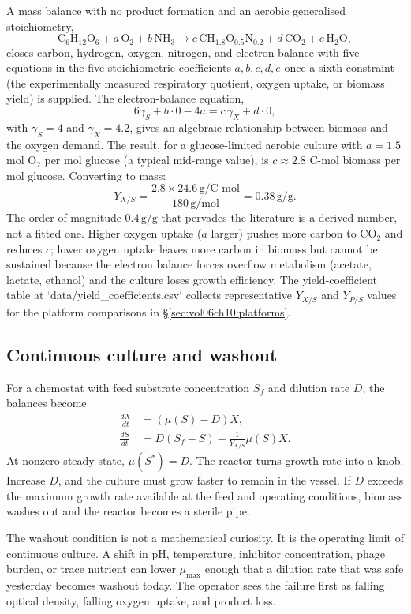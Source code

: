 A mass balance with no product formation and an aerobic generalised
stoichiometry,
\[
\text{C}_6\text{H}_{12}\text{O}_6 + a\,\text{O}_2 + b\,\text{NH}_3
\longrightarrow c\,\text{CH}_{1.8}\text{O}_{0.5}\text{N}_{0.2}
+ d\,\text{CO}_2 + e\,\text{H}_2\text{O},
\]
closes carbon, hydrogen, oxygen, nitrogen, and electron balance with
five equations in the five stoichiometric coefficients $a, b, c, d, e$
once a sixth constraint (the experimentally measured respiratory
quotient, oxygen uptake, or biomass yield) is supplied. The
electron-balance equation,
\[
6\gamma_S + b \cdot 0 - 4a = c\,\gamma_X + d \cdot 0,
\]
with $\gamma_S = 4$ and $\gamma_X = 4.2$, gives an algebraic
relationship between biomass and the oxygen demand. The result, for a
glucose-limited aerobic culture with $a = 1.5$ mol $\text{O}_2$ per mol
glucose (a typical mid-range value), is $c \approx 2.8$ C-mol biomass
per mol glucose. Converting to mass:
\[
Y_{X/S}
= \frac{2.8 \times 24.6\,\text{g/C-mol}}{180\,\text{g/mol}}
= 0.38\,\text{g/g}.
\]
The order-of-magnitude $0.4\,\text{g/g}$ that pervades the literature
is a derived number, not a fitted one. Higher oxygen uptake ($a$ larger)
pushes more carbon to CO$_2$ and reduces $c$; lower oxygen uptake leaves
more carbon in biomass but cannot be sustained because the electron
balance forces overflow metabolism (acetate, lactate, ethanol) and the
culture loses growth efficiency. The yield-coefficient table at
`data/yield_coefficients.csv` collects representative $Y_{X/S}$ and
$Y_{P/S}$ values for the platform comparisons in \S\ref{sec:vol06ch10:platforms}.

\subsection{Continuous culture and washout}

For a chemostat with feed substrate concentration $S_f$ and dilution
rate $D$, the balances become
\begin{align*}
\frac{dX}{dt} &= \left(\mu(S) - D\right)X, \\
\frac{dS}{dt} &= D(S_f - S) - \frac{1}{Y_{X/S}}\mu(S)X.
\end{align*}
At nonzero steady state, $\mu(S^\ast)=D$. The reactor turns growth
rate into a knob. Increase $D$, and the culture must grow faster to
remain in the vessel. If $D$ exceeds the maximum growth rate available
at the feed and operating conditions, biomass washes out and the reactor
becomes a sterile pipe.

The washout condition is not a mathematical curiosity. It is the
operating limit of continuous culture. A shift in pH, temperature,
inhibitor concentration, phage burden, or trace nutrient can lower
$\mu_{\max}$ enough that a dilution rate that was safe yesterday
becomes washout today. The operator sees the failure first as falling
optical density, falling oxygen uptake, and product loss.


